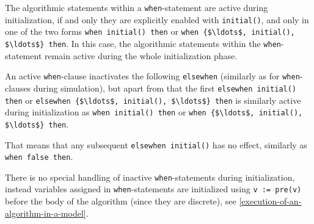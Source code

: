 The algorithmic statements within a \lstinline!when!-statement are active during initialization, if and only they are explicitly enabled with \lstinline!initial()!, and only in one of the two forms \lstinline!when initial() then! or \lstinline!when {$\ldots$, initial(), $\ldots$} then!.
In this case, the algorithmic statements within the \lstinline!when!-statement remain active during the whole initialization phase.

An active \lstinline!when!-clause inactivates the following \lstinline!elsewhen! (similarly as for \lstinline!when!-clauses during simulation), but apart from that
the first \lstinline!elsewhen initial() then! or \lstinline!elsewhen {$\ldots$, initial(), $\ldots$} then! is similarly active during initialization as
\lstinline!when initial() then! or \lstinline!when {$\ldots$, initial(), $\ldots$} then!.

\begin{nonnormative}
That means that any subsequent \lstinline!elsewhen initial()! has no effect,
similarly as \lstinline!when false then!.
\end{nonnormative}

\begin{nonnormative}
There is no special handling of inactive \lstinline!when!-statements during initialization, instead variables assigned in \lstinline!when!-statements are initialized using \lstinline!v := pre(v)! before the body of the algorithm (since they are discrete), see \cref{execution-of-an-algorithm-in-a-model}.
\end{nonnormative}

